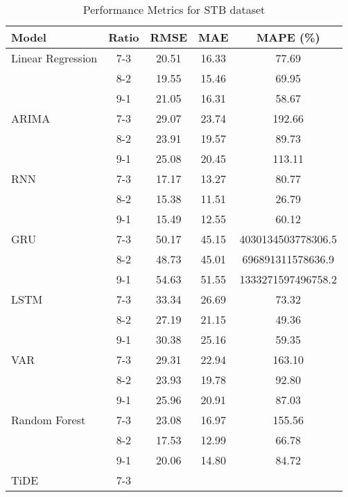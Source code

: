 \begin{table}[h!]
    \centering
    \caption{Performance Metrics for STB dataset}
    \begin{tabular}{|l|c|c|c|c|}
    \hline
    \rowcolor{orange!30} \textbf{Model} & \textbf{Ratio} & \textbf{RMSE} & \textbf{MAE} & \textbf{MAPE (\%)} \\ \hline
    \rowcolor{white} Linear Regression & 7-3 & 20.51 & 16.33 & 77.69 \\ \hline
    \rowcolor{white}  & 8-2 & 19.55 & 15.46 & 69.95 \\ \hline
    \rowcolor{white}  & 9-1 & 21.05 & 16.31 & 58.67 \\ \hline
    \rowcolor{white} ARIMA & 7-3 & 29.07 & 23.74 & 192.66 \\ \hline
    \rowcolor{white}  & 8-2 & 23.91 & 19.57 & 89.73 \\ \hline
    \rowcolor{white}  & 9-1 & 25.08 & 20.45 & 113.11 \\ \hline
    \rowcolor{white} RNN & 7-3 & 17.17 & 13.27 & 80.77 \\ \hline
    \rowcolor{white}  & 8-2 & 15.38 & 11.51 & 26.79 \\ \hline
    \rowcolor{white}  & 9-1 & 15.49 & 12.55 & 60.12 \\ \hline
    \rowcolor{white} GRU & 7-3 & 50.17 & 45.15 & 4030134503778306.5 \\ \hline
    \rowcolor{white}  & 8-2 & 48.73 & 45.01 & 696891311578636.9 \\ \hline
    \rowcolor{white}  & 9-1 & 54.63 & 51.55 & 1333271597496758.2\\ \hline
    \rowcolor{white} LSTM & 7-3 & 33.34 & 26.69 & 73.32 \\ \hline
    \rowcolor{white}  & 8-2 & 27.19 & 21.15 & 49.36 \\ \hline
    \rowcolor{white}  & 9-1 & 30.38 & 25.16 & 59.35 \\ \hline
    \rowcolor{white} VAR & 7-3 & 29.31 & 22.94 & 163.10 \\ \hline
    \rowcolor{white}  & 8-2 & 23.93 & 19.78 & 92.80 \\ \hline
    \rowcolor{white}  & 9-1 & 25.96 & 20.91 & 87.03 \\ \hline
    \rowcolor{white} Random Forest & 7-3 & 23.08 & 16.97 & 155.56 \\ \hline
    \rowcolor{white}  & 8-2 & 17.53 & 12.99 & 66.78 \\ \hline
    \rowcolor{white}  & 9-1 & 20.06 & 14.80 & 84.72 \\ \hline
    \rowcolor{green!30} TiDE & 7-3 &  &  &  \\ \hline

\end{tabular}
\end{table}
